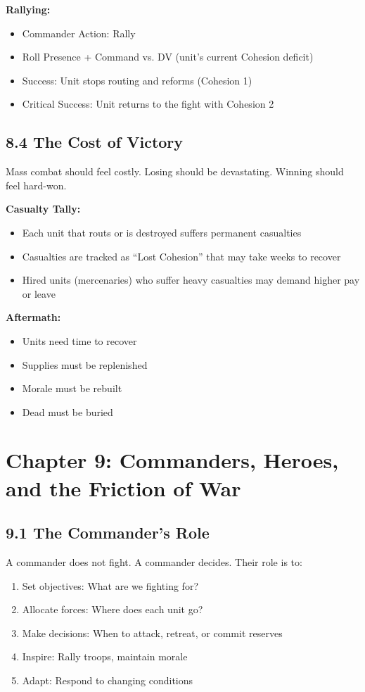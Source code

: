 \documentclass[11pt]{article}
\begin{document}
\textbf{Rallying:}
\begin{itemize}
  \item Commander Action: Rally
  \item Roll Presence + Command vs. DV (unit's current Cohesion deficit)
  \item Success: Unit stops routing and reforms (Cohesion 1)
  \item Critical Success: Unit returns to the fight with Cohesion 2
\end{itemize}

\subsection{8.4 The Cost of Victory}

Mass combat should feel costly. Losing should be devastating. Winning should feel hard-won.

\textbf{Casualty Tally:}
\begin{itemize}
  \item Each unit that routs or is destroyed suffers permanent casualties
  \item Casualties are tracked as ``Lost Cohesion'' that may take weeks to recover
  \item Hired units (mercenaries) who suffer heavy casualties may demand higher pay or leave
\end{itemize}

\textbf{Aftermath:}
\begin{itemize}
  \item Units need time to recover
  \item Supplies must be replenished
  \item Morale must be rebuilt
  \item Dead must be buried
\end{itemize}

\section{Chapter 9: Commanders, Heroes, and the Friction of War}

\subsection{9.1 The Commander's Role}

A commander does not fight. A commander decides. Their role is to:
\begin{enumerate}
  \item Set objectives: What are we fighting for?
  \item Allocate forces: Where does each unit go?
  \item Make decisions: When to attack, retreat, or commit reserves
  \item Inspire: Rally troops, maintain morale
  \item Adapt: Respond to changing conditions
\end{enumerate}
\end{document}
